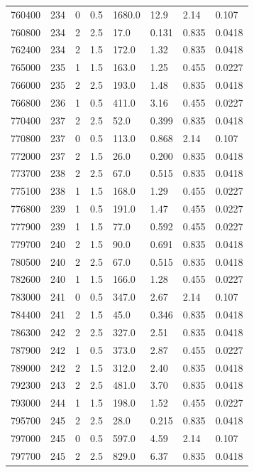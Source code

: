 \documentclass[preview]{standalone}
\begin{document}
{{{{{{{{{{\begin{tabular}{L{1.2cm}C{1.2cm} C{0.3cm}C{0.5cm} C{1.4cm}C{1.4cm} C{1.4cm}C{1.4cm}}
  760400  &   234  & 0     & 0.5 &  1680.0  & 12.9  & 2.14 &  0.107   \\ 
  760800  &   234  & 2     & 2.5 &  17.0  & 0.131  & 0.835 &  0.0418   \\ 
  762400  &   234  & 2     & 1.5 &  172.0  & 1.32  & 0.835 &  0.0418   \\ 
  765000  &   235  & 1     & 1.5 &  163.0  & 1.25  & 0.455 &  0.0227   \\ 
  766000  &   235  & 2     & 2.5 &  193.0  & 1.48  & 0.835 &  0.0418   \\ 
  766800  &   236  & 1     & 0.5 &  411.0  & 3.16  & 0.455 &  0.0227   \\ 
  770400  &   237  & 2     & 2.5 &  52.0  & 0.399  & 0.835 &  0.0418   \\ 
  770800  &   237  & 0     & 0.5 &  113.0  & 0.868  & 2.14 &  0.107   \\ 
  772000  &   237  & 2     & 1.5 &  26.0  & 0.200  & 0.835 &  0.0418   \\ 
  773700  &   238  & 2     & 2.5 &  67.0  & 0.515  & 0.835 &  0.0418   \\ 
  775100  &   238  & 1     & 1.5 &  168.0  & 1.29  & 0.455 &  0.0227   \\ 
  776800  &   239  & 1     & 0.5 &  191.0  & 1.47  & 0.455 &  0.0227   \\ 
  777900  &   239  & 1     & 1.5 &  77.0  & 0.592  & 0.455 &  0.0227   \\ 
  779700  &   240  & 2     & 1.5 &  90.0  & 0.691  & 0.835 &  0.0418   \\ 
  780500  &   240  & 2     & 2.5 &  67.0  & 0.515  & 0.835 &  0.0418   \\ 
  782600  &   240  & 1     & 1.5 &  166.0  & 1.28  & 0.455 &  0.0227   \\ 
  783000  &   241  & 0     & 0.5 &  347.0  & 2.67  & 2.14 &  0.107   \\ 
  784400  &   241  & 2     & 1.5 &  45.0  & 0.346  & 0.835 &  0.0418   \\ 
  786300  &   242  & 2     & 2.5 &  327.0  & 2.51  & 0.835 &  0.0418   \\ 
  787900  &   242  & 1     & 0.5 &  373.0  & 2.87  & 0.455 &  0.0227   \\ 
  789000  &   242  & 2     & 1.5 &  312.0  & 2.40  & 0.835 &  0.0418   \\ 
  792300  &   243  & 2     & 2.5 &  481.0  & 3.70  & 0.835 &  0.0418   \\ 
  793000  &   244  & 1     & 1.5 &  198.0  & 1.52  & 0.455 &  0.0227   \\ 
  795700  &   245  & 2     & 2.5 &  28.0  & 0.215  & 0.835 &  0.0418   \\ 
  797000  &   245  & 0     & 0.5 &  597.0  & 4.59  & 2.14 &  0.107   \\ 
  797700  &   245  & 2     & 2.5 &  829.0  & 6.37  & 0.835 &  0.0418   \\ 
\hline 
\end{tabular} 

}}}}}}}}}}
\end{document}
